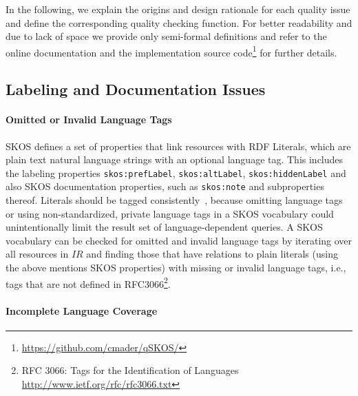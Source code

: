 In the following, we explain the origins and design rationale for each quality issue and define the corresponding quality checking function. For better readability and due to lack of space we provide only semi-formal definitions and refer to the online documentation and the implementation source code\footnote{\url{https://github.com/cmader/qSKOS/}} for further details.


\subsection{Labeling and Documentation Issues}

\paragraph{Omitted or Invalid Language Tags}

SKOS defines a set of properties that link resources with RDF Literals, which are plain text natural language strings with an optional language tag. This includes the labeling properties \texttt{skos:prefLabel}, \texttt{skos:altLabel}, \texttt{skos:hiddenLabel} and also SKOS documentation properties, such as \texttt{skos:note} and subproperties thereof. Literals should be tagged consistently~\cite{Vrandecic2010}, because omitting language tags or using non-standardized, private language tags in a SKOS vocabulary could unintentionally limit the result set of language-dependent queries.
A SKOS vocabulary can be checked for omitted and invalid language tags by iterating over all resources in $IR$ and finding those that have relations to plain literals (using the above mentions SKOS properties) with missing or invalid language tags, i.e., tags that are not defined in RFC3066\footnote{RFC 3066: Tags for the Identification of Languages \url{http://www.ietf.org/rfc/rfc3066.txt}}.

\paragraph{Incomplete Language Coverage}

